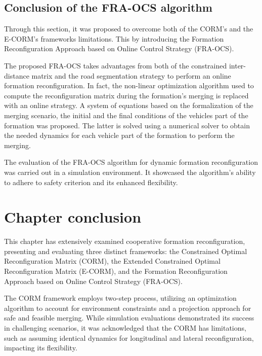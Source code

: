 \newpage
\subsection{Conclusion of the FRA-OCS algorithm}\label{sec:Conclusion_FRA-OCS}

Through this section, it was proposed to overcome both of the CORM's and the E-CORM's frameworks limitations. This by introducing the Formation Reconfiguration Approach based on Online Control Strategy (FRA-OCS). 

The proposed FRA-OCS takes advantages from both of the constrained inter-distance matrix and the road segmentation strategy to perform an online formation reconfiguration. In fact, the non-linear optimization algorithm used to compute the reconfiguration matrix during the formation's merging is replaced with an online strategy. A system of equations based on the formalization of the merging scenario, the initial and the final conditions of the vehicles part of the formation was proposed. The latter is solved using a numerical solver to obtain the needed dynamics for each vehicle part of the formation to perform the merging. 

The evaluation of the FRA-OCS algorithm for dynamic formation reconfiguration was carried out in a simulation environment. It showcased the algorithm's ability to adhere to safety criterion and its enhanced flexibility. 










\section{Chapter conclusion} \label{sec:Chapter_Conclusion}

This chapter has extensively examined cooperative formation reconfiguration, presenting and evaluating three distinct frameworks: the Constrained Optimal Reconfiguration Matrix (CORM), the Extended Constrained Optimal Reconfiguration Matrix (E-CORM), and the Formation Reconfiguration Approach based on Online Control Strategy (FRA-OCS).

The CORM framework employs two-step process, utilizing an optimization algorithm to account for environment constraints and a projection approach for safe and feasible merging. While simulation evaluations demonstrated its success in challenging scenarios, it was acknowledged that the CORM has limitations, such as assuming identical dynamics for longitudinal and lateral reconfiguration, impacting its flexibility. 

